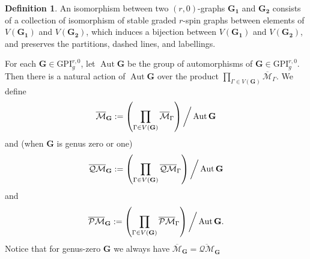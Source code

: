 \documentclass[11pt]{amsart}
\theoremstyle{definition}
\newtheorem{dfn}[dummy]{Definition}
\theoremstyle{remark}
\newcommand{\oPMb}{{\overline{\mathcal{PM}}}}
\newcommand{\oQMb}{{\overline{\mathcal{QM}}}}
\newcommand{\<}{\left<}
\renewcommand{\>}{\right>}
\numberwithin{equation}{section}
\def\Mbar{{\overline{\mathcal M}}}
\def\GPI{{\text{GPI}}}
\begin{document}
\begin{dfn}
    An isomorphism between two $(r,0)$-graphs $\mathbf{G_1}$ and $\mathbf{G_2}$ consists of a collection of isomorphism of stable graded $r$-spin graphs between elements of $V(\mathbf{G_1})$ and $V(\mathbf{G_2})$, which induces a bijection between $V(\mathbf{G_1})$ and $V(\mathbf{G_2})$, and preserves the partitions, dashed lines, and %
labellings.
\end{dfn}

For each %
$\mathbf{G}\in \GPI^{r,0}_g$, let $\operatorname{Aut} \mathbf{G}$ be the group of automorphisms of %
$\mathbf{G}\in \GPI^{r,0}_g$. Then there %
is a natural action of $\operatorname{Aut} \mathbf{G}$ over the product $\prod_{\Gamma\in V(\mathbf{G})} \Mbar_\Gamma$. We define 
$$
\Mbar_\mathbf{G}:=\left(\prod_{\Gamma\in V(\mathbf{G})} \Mbar_\Gamma\right)\bigg\slash \operatorname{Aut} \mathbf{G}
$$
and (when $\mathbf{G}$ is genus zero or one)
$$
\oQMb_\mathbf{G}:=\left(\prod_{\Gamma\in V(\mathbf{G})} \oQMb_\Gamma\right)\bigg\slash \operatorname{Aut} \mathbf{G}
$$
and
$$
\oPMb_\mathbf{G}:=\left(\prod_{\Gamma\in V(\mathbf{G})} \oPMb_\Gamma\right)\bigg\slash \operatorname{Aut} \mathbf{G}.
$$
Notice that for %
genus-zero $\mathbf{G}$ we %
always %
have  $\Mbar_\mathbf{G}=\oQMb_\mathbf{G}$
\end{document}
